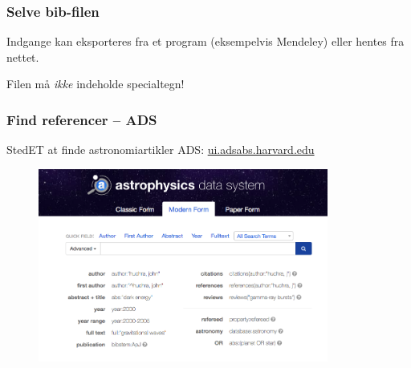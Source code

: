 \documentclass{beamer}
\begin{document}
\begin{frame}
  \frametitle{Selve bib-filen}

  Indgange kan eksporteres fra et program (eksempelvis Mendeley) eller hentes
  fra nettet.

  Filen må \emph{ikke} indeholde \alert{specialtegn}!

\end{frame}


\begin{frame}
  \frametitle{Find referencer -- ADS}

  \bigskip

  \begin{exampleblock}{StedET at finde astronomiartikler}
    ADS: \url{ui.adsabs.harvard.edu}
  \end{exampleblock}

  \begin{figure}[!h]
    \centering
    \includegraphics[width=0.85\textwidth]{figures/ads}
  \end{figure}
\end{frame}
\end{document}
